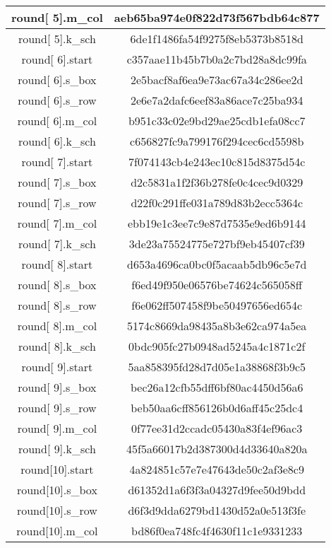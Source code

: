 \begin{center}
\begin{longtable}{|c|c|}
\hline
round[ 5].m\_col&   aeb65ba974e0f822d73f567bdb64c877\\
\hline
round[ 5].k\_sch&   6de1f1486fa54f9275f8eb5373b8518d\\
\hline
round[ 6].start&   c357aae11b45b7b0a2c7bd28a8dc99fa\\
\hline
round[ 6].s\_box&   2e5bacf8af6ea9e73ac67a34c286ee2d\\
\hline
round[ 6].s\_row&   2e6e7a2dafc6eef83a86ace7c25ba934\\
\hline
round[ 6].m\_col&   b951c33c02e9bd29ae25cdb1efa08cc7\\
\hline
round[ 6].k\_sch&   c656827fc9a799176f294cec6cd5598b\\
\hline
round[ 7].start&    7f074143cb4e243ec10c815d8375d54c\\
\hline
round[ 7].s\_box&   d2c5831a1f2f36b278fe0c4cec9d0329\\
\hline
round[ 7].s\_row&   d22f0c291ffe031a789d83b2ecc5364c\\
\hline
round[ 7].m\_col&   ebb19e1c3ee7c9e87d7535e9ed6b9144\\
\hline
round[ 7].k\_sch&   3de23a75524775e727bf9eb45407cf39\\
\hline
round[ 8].start&    d653a4696ca0bc0f5acaab5db96c5e7d\\
\hline
round[ 8].s\_box&   f6ed49f950e06576be74624c565058ff\\
\hline
round[ 8].s\_row&   f6e062ff507458f9be50497656ed654c\\
\hline
round[ 8].m\_col&   5174c8669da98435a8b3e62ca974a5ea\\
\hline
round[ 8].k\_sch&   0bdc905fc27b0948ad5245a4c1871c2f\\
\hline
round[ 9].start&    5aa858395fd28d7d05e1a38868f3b9c5\\
\hline
round[ 9].s\_box&   bec26a12cfb55dff6bf80ac4450d56a6\\
\hline
round[ 9].s\_row&   beb50aa6cff856126b0d6aff45c25dc4\\
\hline
round[ 9].m\_col&   0f77ee31d2ccadc05430a83f4ef96ac3\\
\hline
round[ 9].k\_sch&   45f5a66017b2d387300d4d33640a820a\\
\hline
round[10].start&    4a824851c57e7e47643de50c2af3e8c9\\
\hline
round[10].s\_box&   d61352d1a6f3f3a04327d9fee50d9bdd\\
\hline
round[10].s\_row&   d6f3d9dda6279bd1430d52a0e513f3fe\\
\hline
round[10].m\_col&   bd86f0ea748fc4f4630f11c1e9331233\\

\end{longtable}
\end{center}
